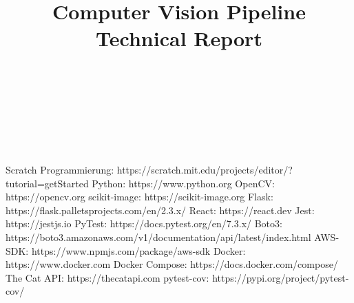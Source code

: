 \documentclass[conference]{IEEEtran}
\begin{document}
\title{\textbf{Computer Vision Pipeline}
	\\Technical Report}

\author{

	\\
	
	\and
	
	\\
	
	\and
	
	\\
	
}


\maketitle



\begin{thebibliography}{00}
	 Scratch Programmierung: https://scratch.mit.edu/projects/editor/?tutorial=getStarted
	 Python: https://www.python.org
	 OpenCV: https://opencv.org
	 scikit-image: https://scikit-image.org
	 Flask: https://flask.palletsprojects.com/en/2.3.x/
	 React: https://react.dev
	 Jest: https://jestjs.io
	 PyTest: https://docs.pytest.org/en/7.3.x/
	 Boto3: https://boto3.amazonaws.com/v1/documentation/api/latest/index.html
	 AWS-SDK: https://www.npmjs.com/package/aws-sdk
	 Docker: https://www.docker.com
	 Docker Compose: https://docs.docker.com/compose/
	 The Cat API: https://thecatapi.com
	 pytest-cov: https://pypi.org/project/pytest-cov/
\end{thebibliography}
\vspace{12pt}
\end{document}
